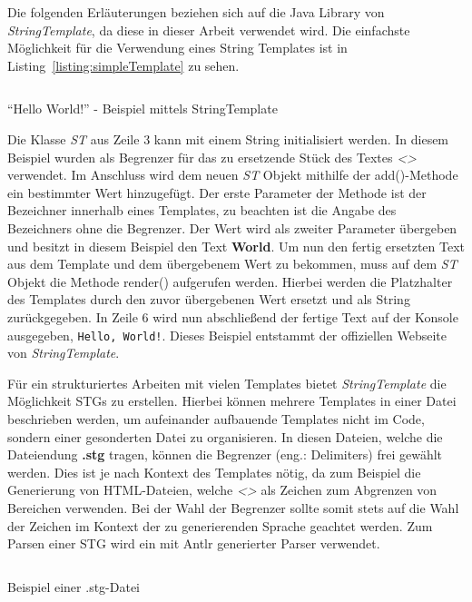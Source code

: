 Die folgenden Erläuterungen beziehen sich auf die Java Library von \textit{StringTemplate}, da diese in dieser Arbeit verwendet wird.
Die einfachste Möglichkeit für die Verwendung eines String Templates ist in Listing~\ref{listing:simpleTemplate} zu sehen.

\begin{listing}[!ht]
    \inputminted{java}{listings/2.2.1/JavaStringTemplateExample.java}
    \caption{``Hello World!'' - Beispiel mittels StringTemplate}
    \label{listing:simpleTemplate}
\end{listing}

Die Klasse \textit{ST} aus Zeile 3 kann mit einem String initialisiert werden.
In diesem Beispiel wurden als Begrenzer für das zu ersetzende Stück des Textes \textit{<>} verwendet.
Im Anschluss wird dem neuen \textit{ST} Objekt mithilfe der add()-Methode ein bestimmter Wert hinzugefügt.
Der erste Parameter der Methode ist der Bezeichner innerhalb eines Templates, zu beachten ist die Angabe des Bezeichners ohne die Begrenzer.
Der Wert wird als zweiter Parameter übergeben und besitzt in diesem Beispiel den Text \textbf{World}.
Um nun den fertig ersetzten Text aus dem Template und dem übergebenem Wert zu bekommen, muss auf dem \textit{ST} Objekt die Methode render() aufgerufen werden.
Hierbei werden die Platzhalter des Templates durch den zuvor übergebenen Wert ersetzt und als String zurückgegeben.
In Zeile 6 wird nun abschließend der fertige Text auf der Konsole ausgegeben, \texttt{Hello, World!}.
Dieses Beispiel entstammt der offiziellen Webseite von \textit{StringTemplate}.\cite*{stOrg}

Für ein strukturiertes Arbeiten mit vielen Templates bietet \textit{StringTemplate} die Möglichkeit \ac{STG}s zu erstellen.
Hierbei können mehrere Templates in einer Datei beschrieben werden, um aufeinander aufbauende Templates nicht im Code, sondern einer gesonderten Datei zu organisieren.
In diesen Dateien, welche die Dateiendung \textbf{.stg} tragen, können die Begrenzer (eng.: Delimiters) frei gewählt werden.
Dies ist je nach Kontext des Templates nötig, da zum Beispiel die Generierung von HTML-Dateien, welche \textit{<>} als Zeichen zum Abgrenzen von Bereichen verwenden.
Bei der Wahl der Begrenzer sollte somit stets auf die Wahl der Zeichen im Kontext der zu generierenden Sprache geachtet werden.
Zum Parsen einer \ac{STG} wird ein mit Antlr generierter Parser verwendet.\cite*{stgParser}

\begin{listing}[!ht]
    \inputminted{c}{listings/2.2.1/Example.stg}
    \caption{Beispiel einer .stg-Datei}
    \label{listing:stgFile}
\end{listing}

